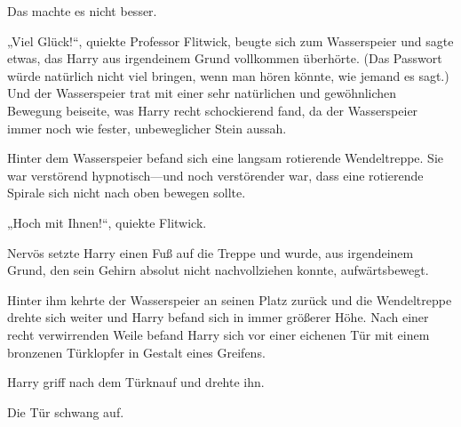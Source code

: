 Das machte es nicht besser.

„Viel Glück!“, quiekte Professor Flitwick, beugte sich zum Wasserspeier und sagte etwas, das Harry aus irgendeinem Grund vollkommen überhörte. (Das Passwort würde natürlich nicht viel bringen, wenn man hören könnte, wie jemand es sagt.) Und der Wasserspeier trat mit einer sehr natürlichen und gewöhnlichen Bewegung beiseite, was Harry recht schockierend fand, da der Wasserspeier immer noch wie fester, unbeweglicher Stein aussah.

Hinter dem Wasserspeier befand sich eine langsam rotierende Wendeltreppe. Sie war verstörend hypnotisch—und noch verstörender war, dass eine rotierende Spirale sich nicht nach oben bewegen sollte.

„Hoch mit Ihnen!“, quiekte Flitwick.

Nervös setzte Harry einen Fuß auf die Treppe und wurde, aus irgendeinem Grund, den sein Gehirn absolut nicht nachvollziehen konnte, aufwärtsbewegt.

Hinter ihm kehrte der Wasserspeier an seinen Platz zurück und die Wendeltreppe drehte sich weiter und Harry befand sich in immer größerer Höhe. Nach einer recht verwirrenden Weile befand Harry sich vor einer eichenen Tür mit einem bronzenen Türklopfer in Gestalt eines Greifens.

Harry griff nach dem Türknauf und drehte ihn.

Die Tür schwang auf.

